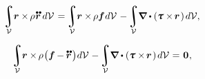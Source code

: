 \begin{otherlanguage}{russian}
\nopagebreak\vspace{-0.2em}\begin{equation*}
\integral\displaylimits_{\mathcal{V}} \hspace{-0.5ex} \currentlocationvector \times \hspace{-0.2ex} \rho \hspace{.1ex} \mathdotdotabove{\currentlocationvector} \hspace{.4ex} d\mathcal{V} \hspace{.22ex}
= \hspace{-0.2ex} \integral\displaylimits_{\mathcal{V}} \hspace{-0.5ex} \currentlocationvector \times \hspace{-0.2ex} \rho \bm{f} \hspace{0.1ex} d\mathcal{V} \hspace{.2ex}
- \hspace{-0.2ex} \integral\displaylimits_{\mathcal{V}} \hspace{-0.5ex} \boldnabla \dotp \left( \cauchystress \times \hspace{-0.24ex} \currentlocationvector \hspace{.2ex} \right) \hspace{-0.1ex} d\mathcal{V} ,
\end{equation*}

\nopagebreak\vspace{-0.2em}\begin{equation*}
\integral\displaylimits_{\mathcal{V}} \hspace{-0.5ex} \currentlocationvector \times \hspace{-0.2ex} \rho \hspace{.15ex} \bigl( \bm{f} \hspace{-0.1ex} - \hspace{-0.1ex} \mathdotdotabove{\currentlocationvector} \hspace{.2ex} \bigr) \hspace{.1ex} d\mathcal{V} \hspace{.12ex}
- \hspace{-0.2ex} \integral\displaylimits_{\mathcal{V}} \hspace{-0.5ex} \boldnabla \dotp \left( \cauchystress \times \hspace{-0.24ex} \currentlocationvector \hspace{.2ex} \right) \hspace{-0.1ex} d\mathcal{V} \hspace{.1ex}
= \hspace{.15ex} \zerovector
\hspace{.1ex} ,
\end{equation*}


\end{otherlanguage}
